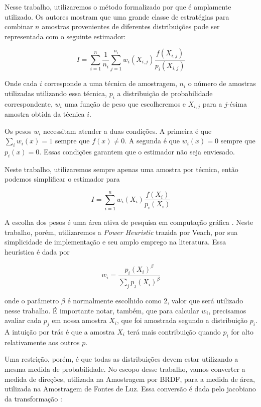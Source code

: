 Nesse trabalho, utilizaremos o método formalizado por \citet{veach95} que é
amplamente utilizado. Os autores mostram que uma grande classe de estratégias
para combinar $n$ amostras provenientes de diferentes distribuições pode ser
representada com o seguinte estimador:

\begin{equation*}
  I = \sum_{i=1}^n \frac{1}{n_i} \sum_{j=1}^{n_i} w_i(X_{i,j})
    \frac{f(X_{i,j})}{p_i(X_{i,j})}
\end{equation*}

Onde cada $i$ corresponde a uma técnica de amostragem, $n_i$ o número de
amostras utilizadas utilizando essa técnica, $p_i$ a distribuição de
probabilidade correspondente, $w_i$ uma função de peso que escolheremos e
$X_{i,j}$ para a $j$-ésima amostra obtida da técnica $i$. 

Os pesos $w_i$ necessitam atender a duas condições. A primeira é que $\sum_i
w_i(x) = 1$ sempre que $f(x) \not = 0$. A segunda é que $w_i(x) = 0$ sempre que
$p_i(x) = 0$. Essas condições garantem que o estimador não seja enviesado.

Neste trabalho, utilizaremos sempre apenas uma amostra por técnica, então
podemos simplificar o estimador para 

\begin{equation}
  I = \sum_{i=1}^n w_i(X_{i}) \frac{f(X_i)}{p_i(X_i)}
  \label{eq:misestimator}
\end{equation}

A escolha dos pesos é uma área ativa de pesquisa em computação gráfica
\citep{kondapaneni19, hua25, muller19}. Neste trabalho, porém, utilizaremos a
\emph{Power Heuristic} trazida por Veach, por sua simplicidade de implementação
e seu amplo emprego na literatura. Essa heurística é dada por

\[
  w_i = \frac{p_i(X_i)^\beta}{\textstyle \sum_j p_j(X_i)^\beta}
\]

onde o parâmetro $\beta$ é normalmente escolhido como $2$, valor que será
utilizado nesse trabalho. É importante notar, também, que para calcular $w_i$,
precisamos avaliar cada $p_j$ em nossa amostra $X_i$, que foi amostrada segundo
a distribuição $p_i$. A intuição por trás é que a amostra $X_i$ terá mais
contribuição quando $p_i$ for alto relativamente aos outros $p$. 

Uma restrição, porém, é que todas as distribuições devem estar utilizando a
mesma medida de probabilidade. No escopo desse trabalho, vamos converter a
medida de direções, utilizada na Amostragem por BRDF, para a medida de área,
utilizada na Amostragem de Fontes de Luz. Essa conversão é dada pelo jacobiano
da transformação \citep[Cap. 8.2.2.2]{veach97}:

